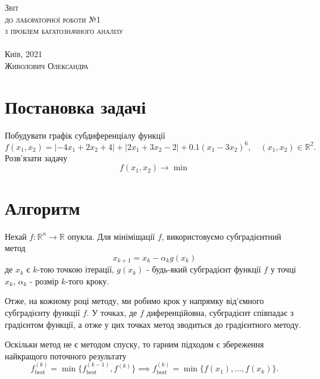 \documentclass[a4paper, 14pt]{extarticle}
\begin{document}
\begin{center}
    \vspace*{\fill}
    \textsc{{Звіт}}\\
    \textsc{до лабораторної роботи №1}\\
    \textsc{{з проблем багатозначного аналізу}}\\
    \textsc{}\\
    \vspace*{\fill}
    \textsc{{Київ, 2021}}\\
    \textsc{{Живолович Олександра}}
\end{center}
\thispagestyle{empty}

\newpage
\thispagestyle{empty}
\tableofcontents

\section{Постановка задачі}
Побудувати графік субдиференціалу функції 
\begin{equation}
f(x_1,x_2) = |-4x_1+2x_2+4| + |2x_1+3x_2-2| + 0.1(x_1-3x_2)^6, \quad (x_1,x_2) \in \mathbb{R}^2.
\end{equation}
Розв'язати задачу 
\begin{equation}
    f(x_1,x_2) \to\min
\end{equation}
\section{Алгоритм}
Нехай $f:\mathbb{R}^n\to\mathbb{R}$ опукла. Для мініміщації $f$,
використовуємо субградієнтний метод
\begin{equation}
    x_{k+1} = x_k - \alpha_k g(x_k)
\end{equation} 
де $x_k$ є $k$-тою точкою ітерації, $g(x_k)$ - будь-який субградієнт 
функції $f$ у точці $x_k$, $\alpha_k$ - розмір $k$-того кроку.

Отже, на кожному році методу, ми робимо крок у напрямку 
від'ємного субградієнту функції $f$. У точках, де 
$f$ диференційовна, субградієнт співпадає з градієнтом функції, а отже 
у цих точках метод зводиться до градієнтного методу.

Оскільки метод не є методом спуску, то гарним підходом 
є збереження найкращого поточного результату 
\begin{equation*}
    f^{(k)}_{\text{best}} = \min\{f^{(k-1)}_{\text{best}}, f^{(k)}\}
    \implies f^{(k)}_{\text{best}} =
    \min\{f(x_1),\hdots , f(x_k)\}.
\end{equation*}
\end{document}
